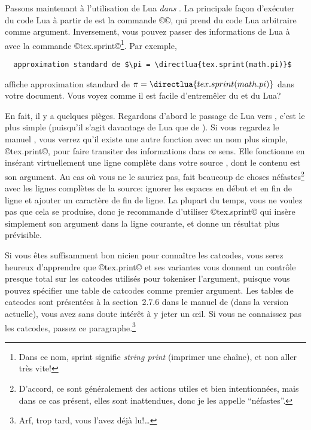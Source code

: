 \documentclass{lltxdoc}
\begin{document}
\medskip

Passons maintenant à l'utilisation de Lua \emph{dans} \luatex. La principale
façon d'exécuter du code Lua à partir de \tex est la commande ©\directlua©,
qui prend du code Lua arbitraire comme argument. Inversement, vous pouvez
passer des informations de Lua à \tex avec la commande ©tex.sprint©\footnote{Dans
  ce nom, \og{}sprint\fg{} signifie \og{}\emph{string print}\fg{}
  (\og{}imprimer une chaîne\fg{}), et non \og{}aller très vite\fg{}!}.
Par exemple,
\begin{Verbatim}
  approximation standard de $\pi = \directlua{tex.sprint(math.pi)}$
\end{Verbatim}
affiche \og{}approximation standard de $\pi = \directlua{tex.sprint(math.pi)}$\fg
dans votre document. Vous voyez comme il est facile d'entremêler du \tex et du Lua?

En fait, il y a quelques pièges. Regardons d'abord le passage de Lua vers \tex,
c'est le plus simple (puisqu'il s'agit davantage de Lua que de \tex).
Si vous regardez le manuel \luatex, vous verrez qu'il existe une autre fonction
avec un nom plus simple, ©tex.print©, pour faire transiter des informations
dans ce sens. Elle fonctionne en insérant virtuellement une ligne complète
dans votre source \tex, dont le contenu est son argument. Au cas où vous ne
le sauriez pas, \tex fait beaucoup de choses néfastes\footnote{D'accord, ce
  sont généralement des actions utiles et bien intentionnées, mais dans ce
  cas présent, elles sont inattendues, donc je les appelle ``néfastes''.} avec
les lignes complètes de la source: ignorer les espaces en début et en fin
de ligne et ajouter un caractère de fin de ligne. La plupart du temps, vous
ne voulez pas que cela se produise, donc je recommande d'utiliser ©tex.sprint©
qui insère simplement son argument dans la ligne courante, et donne un résultat
plus prévisible.

Si vous êtes suffisamment bon \tex{}nicien pour connaître les catcodes,
vous serez heureux d'apprendre que ©tex.print© et ses variantes vous donnent
un contrôle presque total sur les catcodes utilisés pour tokeniser l'argument,
puisque vous pouvez spécifier une table de catcodes comme premier argument.
Les tables de catcodes sont présentées à la section~2.7.6 dans le manuel de
\luatex (dans la version actuelle), vous avez sans doute intérêt à y jeter
un \oe il. Si vous ne connaissez pas les catcodes, passez ce
paragraphe.\footnote{Arf, trop tard, vous l'avez déjà lu!\dots}

\medskip
\end{document}
